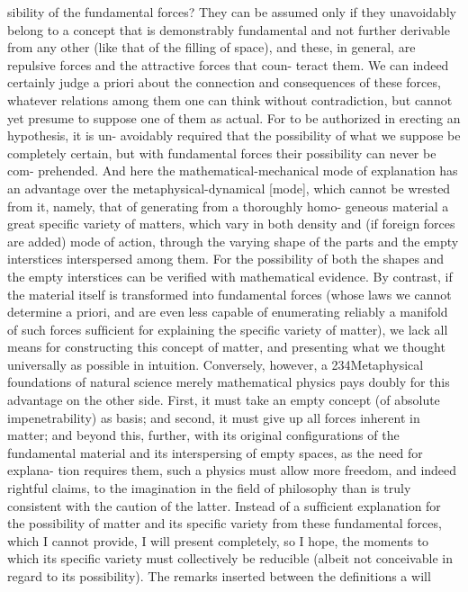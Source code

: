 sibility of the fundamental forces? They can be assumed only if they
unavoidably belong to a concept that is demonstrably fundamental and
not further derivable from any other (like that of the ﬁlling of space), and
these, in general, are repulsive forces and the attractive forces that coun-
teract them. We can indeed certainly judge a priori about the connection
and consequences of these forces, whatever relations among them one
can think without contradiction, but cannot yet presume to suppose one
of them as actual. For to be authorized in erecting an hypothesis, it is un-
avoidably required that the possibility of what we suppose be completely
certain, but with fundamental forces their possibility can never be com-
prehended. And here the mathematical-mechanical mode of explanation
has an advantage over the metaphysical-dynamical [mode], which cannot
be wrested from it, namely, that of generating from a thoroughly homo-
geneous material a great speciﬁc variety of matters, which vary in both
density and (if foreign forces are added) mode of action, through the
varying shape of the parts and the empty interstices interspersed among
them. For the possibility of both the shapes and the empty interstices can
be veriﬁed with mathematical evidence. By contrast, if the material itself
is transformed into fundamental forces (whose laws we cannot determine
a priori, and are even less capable of enumerating reliably a manifold of
such forces sufﬁcient for explaining the speciﬁc variety of matter), we
lack all means for constructing this concept of matter, and presenting what
we thought universally as possible in intuition. Conversely, however, a
234Metaphysical foundations of natural science
merely mathematical physics pays doubly for this advantage on the other
side. First, it must take an empty concept (of absolute impenetrability)
as basis; and second, it must give up all forces inherent in matter; and
beyond this, further, with its original conﬁgurations of the fundamental
material and its interspersing of empty spaces, as the need for explana-
tion requires them, such a physics must allow more freedom, and indeed
rightful claims, to the imagination in the ﬁeld of philosophy than is truly
consistent with the caution of the latter.
Instead of a sufﬁcient explanation for the possibility of matter and its
speciﬁc variety from these fundamental forces, which I cannot provide,
I will present completely, so I hope, the moments to which its speciﬁc
variety must collectively be reducible (albeit not conceivable in regard
to its possibility). The remarks inserted between the deﬁnitions a will
